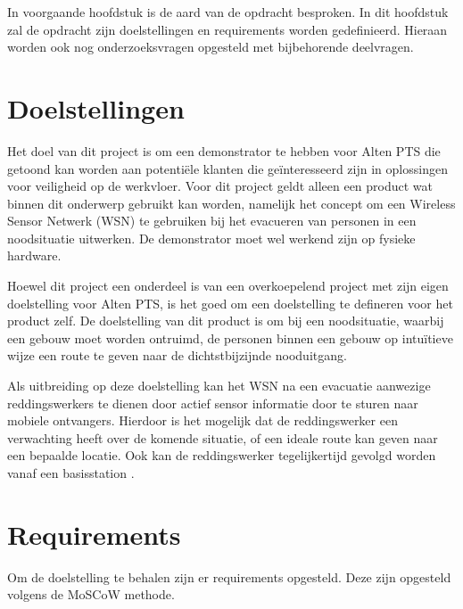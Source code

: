 \documentclass{../local}
\begin{document}
In voorgaande hoofdstuk is de aard van de opdracht besproken. In dit hoofdstuk zal de opdracht zijn doelstellingen en requirements worden gedefinieerd. Hieraan worden ook nog onderzoeksvragen opgesteld met bijbehorende deelvragen.

\section{Doelstellingen}
Het doel van dit project is om een demonstrator te hebben voor Alten PTS die getoond kan worden aan potentiële klanten die geïnteresseerd zijn in oplossingen voor veiligheid op de werkvloer. Voor dit project geldt alleen een product wat binnen dit onderwerp gebruikt kan worden, namelijk het concept om een Wireless Sensor Netwerk (WSN) te gebruiken bij het evacueren van personen in een noodsituatie uitwerken. De demonstrator moet wel werkend zijn op fysieke hardware.

Hoewel dit project een onderdeel is van een overkoepelend project met zijn eigen doelstelling voor Alten PTS, is het goed om een doelstelling te defineren voor het product zelf. De doelstelling van dit product is om bij een noodsituatie, waarbij een gebouw moet worden ontruimd, de personen binnen een gebouw op intuïtieve wijze een route te geven naar de dichtstbijzijnde nooduitgang. 

Als uitbreiding op deze doelstelling kan het WSN na een evacuatie aanwezige reddingswerkers te dienen door actief sensor informatie door te sturen naar mobiele ontvangers. Hierdoor is het mogelijk dat de reddingswerker een verwachting heeft over de komende situatie, of een ideale route kan geven naar een bepaalde locatie. Ook kan de reddingswerker tegelijkertijd gevolgd worden vanaf een basisstation \cite{ShaWSN}.

\section{Requirements}
Om de doelstelling te behalen zijn er requirements opgesteld. Deze zijn opgesteld volgens de MoSCoW methode. 
\\\\
\end{document}
